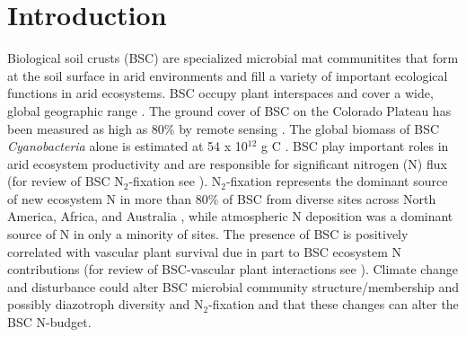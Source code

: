 \section{Introduction}
Biological soil crusts (BSC) are specialized microbial mat communitites that
form at the soil surface in arid environments and fill a variety of important
ecological functions in arid ecosystems. BSC occupy plant interspaces and cover
a wide, global geographic range \citep{garcia2003estimates}. The ground cover
of BSC on the Colorado Plateau has been measured as high as 80\% by remote
sensing \citep{karnieli2001}. The global biomass of BSC \textit{Cyanobacteria}
alone is estimated at 54 x 10$^{12}$ g C \citep{garcia2003estimates}. BSC play
important roles in arid ecosystem productivity and are responsible for
significant nitrogen (N) flux (for review of BSC N$_{2}$-fixation see
\citet{belnap2003}).  N$_{2}$-fixation represents the dominant source of new
ecosystem N in more than 80\% of BSC from diverse sites across North America,
Africa, and Australia \citep{Evans_1999}, while atmospheric N deposition was a
dominant source of N in only a minority of sites. The presence of BSC is
positively correlated with vascular plant survival due in part to BSC ecosystem
N contributions (for review of BSC-vascular plant interactions see
\citet{BelnapVascular}). Climate change and disturbance could alter BSC
microbial community structure/membership and possibly diazotroph diversity and
N$_{2}$-fixation and that these changes can alter the BSC N-budget.

